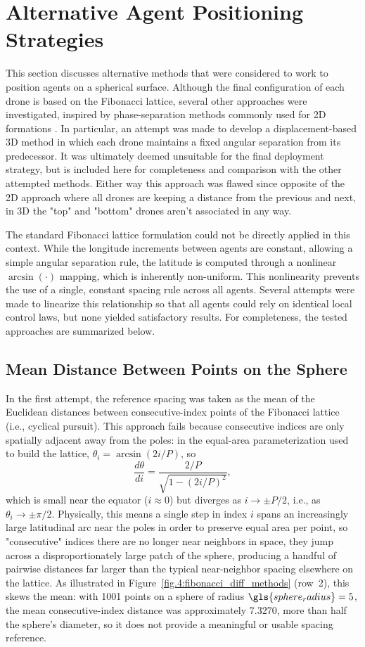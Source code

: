 \section{Alternative Agent Positioning Strategies} \label{annex:Alternative Agent Positioning Strategies}

This section discusses alternative methods that were considered to work to position agents on a spherical surface. Although the final configuration of each drone is based on the Fibonacci lattice, several other approaches were investigated, inspired by phase-separation methods commonly used for 2D formations \cite{Litimein2021,Jin2018,Kim2007}.  In particular, an attempt was made to develop a displacement-based 3D method in which each drone maintains a fixed angular separation from its predecessor. It was ultimately deemed unsuitable for the final deployment strategy, but is included here for completeness and comparison with the other attempted methods. Either way this approach was flawed since opposite of the 2D approach where all drones are keeping a distance from the previous and next, in 3D the "top" and "bottom" drones aren't associated in any way.

The standard Fibonacci lattice formulation could not be directly applied in this context. While the longitude increments between agents are constant, allowing a simple angular separation rule, the latitude is computed through a nonlinear $\arcsin(\cdot)$ mapping, which is inherently non-uniform. This nonlinearity prevents the use of a single, constant spacing rule across all agents. Several attempts were made to linearize this relationship so that all agents could rely on identical local control laws, but none yielded satisfactory results. For completeness, the tested approaches are summarized below.

\subsection{Mean Distance Between Points on the Sphere}
In the first attempt, the reference spacing was taken as the mean of the Euclidean distances between consecutive-index points of the Fibonacci lattice (i.e., cyclical pursuit). This approach fails because consecutive indices are only spatially adjacent away from the poles: in the equal-area parameterization used to build the lattice, $\theta_i = \arcsin(2i/P)$, so
\[
\frac{d\theta}{di} = \frac{2/P}{\sqrt{1-\left(2i/P\right)^2}},
\]
which is small near the equator ($i \approx 0$) but diverges as $i \to \pm P/2$, i.e., as $\theta_i \to \pm\pi/2$. Physically, this means a single step in index $i$ spans an increasingly large latitudinal arc near the poles in order to preserve equal area per point, so "consecutive" indices there are no longer near neighbors in space, they jump across a disproportionately large patch of the sphere, producing a handful of pairwise distances far larger than the typical near-neighbor spacing elsewhere on the lattice. As illustrated in Figure~\ref{fig.4:fibonacci_diff_methods} (row~2), this skews the mean: with 1001 points on a sphere of radius $\gls{sphere_radius} = 5$, the mean consecutive-index distance was approximately 7.3270, more than half the sphere's diameter, so it does not provide a meaningful or usable spacing reference.

